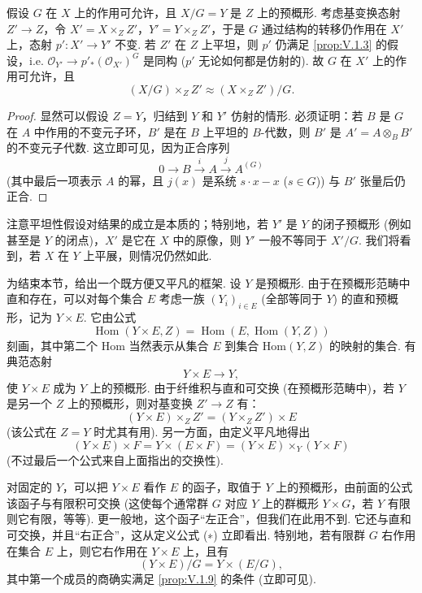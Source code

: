 \begin{proposition}\label{prop:V.1.9}
假设 $G$ 在 $X$ 上的作用可允许，且 $X/G = Y$ 是 $Z$ 上的预概形. 考虑基变换态射 $Z' \to Z$，令 $X' = X \times_Z Z'$，$Y' = Y \times_Z Z'$，于是 $G$ 通过结构的转移仍作用在 $X'$ 上，态射 $p' \colon X' \to Y'$ 不变. 若 $Z'$ 在 $Z$ 上平坦，则 $p'$ 仍满足 \ref{prop:V.1.3} 的假设，i.e. $\mathcal{O}_{Y'} \longrightarrow p'_{*}(\mathcal{O}_{X'})^{G}$ 是同构 ($p'$ 无论如何都是仿射的). 故 $G$ 在 $X'$ 上的作用可允许，且
\[
(X/G) \times_Z Z' \approx (X \times_Z Z')/G.
\]
\end{proposition}

\begin{proof}
显然可以假设 $Z = Y$，归结到 $Y$ 和 $Y'$ 仿射的情形. 必须证明：若 $B$ 是 $G$ 在 $A$ 中作用的不变元子环，$B'$ 是在 $B$ 上平坦的 $B$-代数，则 $B'$ 是 $A' = A \otimes_B B'$ 的不变元子代数. 这立即可见，因为正合序列
\[
0 \longrightarrow B \stackrel{i}{\longrightarrow} A \stackrel{j}{\longrightarrow} A^{(G)}
\]
(其中最后一项表示 $A$ 的幂，且 $j(x)$ 是系统 $s \cdot x - x$ ($s \in G$)) 与 $B'$ 张量后仍正合.
\end{proof}

注意平坦性假设对结果的成立是本质的；特别地，若 $Y'$ 是 $Y$ 的闭子预概形 (例如甚至是 $Y$ 的闭点)，$X'$ 是它在 $X$ 中的原像，则 $Y'$ 一般不等同于 $X'/G$. 我们将看到，若 $X$ 在 $Y$ 上平展，则情况仍然如此.

为结束本节，给出一个既方便又平凡的框架. 设 $Y$ 是预概形. 由于在预概形范畴中直和存在，可以对每个集合 $E$ 考虑一族 $(Y_i)_{i \in E}$ (全部等同于 $Y$) 的直和预概形，记为 $Y \times E$. 它由公式
\begin{equation}
\operatorname{Hom}(Y \times E, Z) = \operatorname{Hom}(E, \operatorname{Hom}(Y, Z)) \tag{($*$)}
\end{equation}
刻画，其中第二个 Hom 当然表示从集合 $E$ 到集合 $\mathrm{Hom}(Y, Z)$ 的映射的集合. 有典范态射
\[
Y \times E \longrightarrow Y,
\]
使 $Y \times E$ 成为 $Y$ 上的预概形. 由于纤维积与直和可交换 (在预概形范畴中)，若 $Y$ 是另一个 $Z$ 上的预概形，则对基变换 $Z' \to Z$ 有：
\[
(Y \times E) \times_Z Z' = (Y \times_Z Z') \times E
\]
(该公式在 $Z = Y$ 时尤其有用). 另一方面，由定义平凡地得出
\[
(Y \times E) \times F = Y \times (E \times F) = (Y \times E) \times_Y (Y \times F)
\]
(不过最后一个公式来自上面指出的交换性).

对固定的 $Y$，可以把 $Y \times E$ 看作 $E$ 的函子，取值于 $Y$ 上的预概形，由前面的公式该函子与有限积可交换 (这使每个通常群 $G$ 对应 $Y$ 上的群概形 $Y \times G$，若 $Y$ 有限则它有限，等等). 更一般地，这个函子``左正合''，但我们在此用不到. 它还与直和可交换，并且``右正合''，这从定义公式 (∗) 立即看出. 特别地，若有限群 $G$ 右作用在集合 $E$ 上，则它右作用在 $Y \times E$ 上，且有
\[
(Y \times E)/G = Y \times (E/G),
\]
其中第一个成员的商确实满足 \ref{prop:V.1.9} 的条件 (立即可见).

